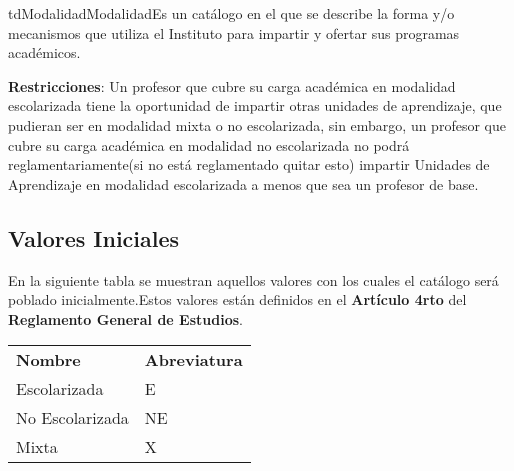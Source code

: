 \begin{TipoDeDato}{tdModalidad}{Modalidad}{Es un catálogo en el que se describe la forma y/o mecanismos que utiliza el Instituto para impartir y ofertar  sus programas académicos.}
	
	\textbf{Restricciones}: Un profesor que cubre su carga académica en modalidad escolarizada tiene la oportunidad de impartir otras unidades de aprendizaje, que pudieran ser  en modalidad mixta o no escolarizada, sin embargo, un profesor que cubre su carga académica en modalidad no escolarizada no podrá reglamentariamente(si  no está reglamentado quitar esto) impartir Unidades de Aprendizaje en modalidad escolarizada a menos que sea un profesor de base.
		
		\begin{tdAtributos}
				
			
		\end{tdAtributos}
		\subsection{Valores Iniciales}
			En la siguiente tabla se muestran aquellos valores con los cuales el catálogo será poblado inicialmente.Estos valores están definidos en el \textbf{Artículo 4rto} del \textbf{Reglamento General de Estudios}. \cdtEmpty
		
		\begin{longtable}{| p{}| p{}|}
	 			\rowcolor{colorPrincipal}
	 			\multicolumn{2}{|c|}{\bf \color{white} Valores Iniciales}\\
	 			\hline
	 			\rowcolor{colorSecundario}
	 			\bf \color{white} Nombre & \bf \color{white} Abreviatura \\
	 			\hline
	 			Escolarizada & E\\
	 			\hline
	 			No Escolarizada & NE \\
	 			\hline
	 			Mixta & X \\
	 			\hline
	 		\end{longtable}
\end{TipoDeDato}